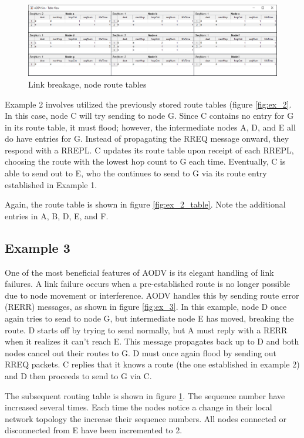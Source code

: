 \documentclass[conference]{IEEEtran}
\begin{document}
\begin{figure}[ht]
	\centering
	\includegraphics[width=6.8in]{Ex_3_table.png}
	\caption{Link breakage, node route tables}
	\label{fig:ex_3_table}
\end{figure}

Example 2 involves utilized the previously stored route tables (figure \ref{fig:ex_2}. In this case, node C will try sending to node G. Since C contains no entry for G in its route table, it must flood; however, the intermediate nodes A, D, and E all do have entries for G. Instead of propagating the RREQ message onward, they respond with a RREPL. C updates its route table upon receipt of each RREPL, choosing the route with the lowest hop count to G each time. Eventually, C is able to send out to E, who the continues to send to G via its route entry established in Example 1.

Again, the route table is shown in figure \ref{fig:ex_2_table}. Note the additional entries in A, B, D, E, and F.

\subsection{Example 3}

One of the most beneficial features of AODV is its elegant handling of link failures. A link failure occurs when a pre-established route is no longer possible due to node movement or interference. AODV handles this by sending route error (RERR) messages, as shown in figure \ref{fig:ex_3}. In this example, node D once again tries to send to node G, but intermediate node E has moved, breaking the route. D starts off by trying to send normally, but A must reply with a RERR when it realizes it can't reach E. This message propagates back up to D and both nodes cancel out their routes to G. D must once again flood by sending out RREQ packets. C replies that it knows a route (the one established in example 2) and D then proceeds to send to G via C.

The subsequent routing table is shown in figure \ref{fig:ex_3_table}. The sequence number have increased several times. Each time the nodes notice a change in their local network topology the increase their sequence numbers. All nodes connected or disconnected from E have been incremented to 2.
\end{document}
